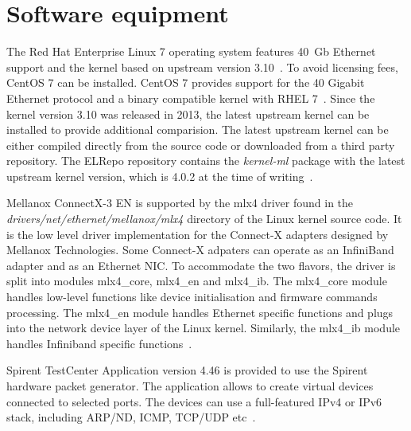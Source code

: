 
\section{Software equipment}\label{sec:analysis-software}
The Red Hat Enterprise Linux 7 operating system features 40~Gb Ethernet support and
the kernel based on upstream version 3.10~\cite{rhel-7-announce}.
To avoid licensing fees, CentOS 7 can be installed.
CentOS 7 provides support for the 40 Gigabit Ethernet protocol and a binary compatible kernel with RHEL 7~\cite{centos-7-announce}.
Since the kernel version 3.10 was released in 2013, the latest upstream kernel can be installed
to provide additional comparision.
The latest upstream kernel can be either compiled directly from the source code or downloaded from a third party repository.
The ELRepo repository contains the {\it{kernel-ml}} package
with the latest upstream kernel version, which is 4.0.2 at the time of writing~\cite{elrepo-kernel-ml}.

Mellanox ConnectX-3 EN is supported by the mlx4 driver found in the
{\it{drivers/net/ethernet/mellanox/mlx4}} directory of the Linux kernel source code.
It is the low level driver implementation for the Connect-X adapters designed by Mellanox Technologies.
Some Connect-X adpaters can operate as an InfiniBand adapter and as an Ethernet NIC.
To accommodate the two flavors, the driver is split into modules mlx4\_core, mlx4\_en and mlx4\_ib.
The mlx4\_core module handles low-level functions like device initialisation and firmware commands processing.
The mlx4\_en module handles Ethernet specific functions and
plugs into the network device layer of the Linux kernel.
Similarly, the mlx4\_ib module handles Infiniband specific functions~\cite{mellanox-user-manual}.

Spirent TestCenter Application version 4.46 is provided to use the Spirent hardware packet generator.
The application allows to create virtual devices connected to selected ports.
The devices can use a full-featured IPv4 or IPv6 stack, including ARP/ND, ICMP, TCP/UDP etc~\cite{spirent-app}.
